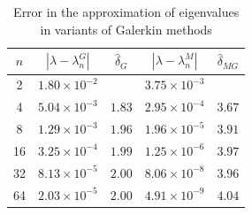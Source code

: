 \documentclass[pdflatex, sn-mathphys-num]{sn-jnl}%
\newcommand{\norm}[1]{\left\lVert #1\right\rVert}
\theoremstyle{thmstyleone}%
\theoremstyle{thmstyletwo}%
\theoremstyle{thmstylethree}%
\begin{document}
\begin{table}[h!]
	\footnotesize
	\centering
	\setlength{\tabcolsep}{8pt}
	\renewcommand{\arraystretch}{1.2}
	\caption{Error in the approximation of eigenvalues in variants of Galerkin methods}
	\label{table:031}
	\begin{tabular}{|c|c c|c c|}
		\hline
		$n$ & $|\lambda - \lambda_n^G|$ & $\hat\delta_{G}$ & $|\lambda - \lambda_n^M|$ & $\hat\delta_{MG}$  \\[3pt] 
		\hline
		2   & $1.80 \times 10^{-2}$ &            & $3.75 \times 10^{-3}$ &           \\[3pt] 
		4   & $5.04 \times 10^{-3}$ & $1.83$     & $2.95 \times 10^{-4}$ & $3.67$     \\[3pt] 
		8   & $1.29 \times 10^{-3}$ & $1.96$     & $1.96 \times 10^{-5}$ & $3.91$     \\[3pt] 
		16  & $3.25 \times 10^{-4}$ & $1.99$     & $1.25 \times 10^{-6}$ & $3.97$     \\[3pt] 
		32  & $8.13 \times 10^{-5}$ & $2.00$     & $8.06 \times 10^{-8}$ & $3.96$     \\[3pt] 
		64  & $2.03 \times 10^{-5}$ & $2.00$     & $4.91 \times 10^{-9}$ & $4.04$     \\[3pt] 
		\hline
	\end{tabular}
\end{table}

\end{document}
